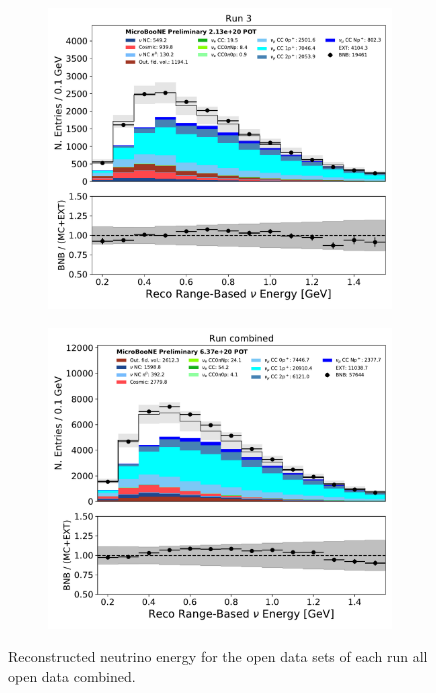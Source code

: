 \begin{figure}[hbt!]
\begin{center}
\begin{subfigure}[b]{0.35\textwidth}
    \end{subfigure}
    \begin{subfigure}[b]{0.35\textwidth}
        \centering
        \includegraphics[width=1.00\textwidth]{NuMuCCsel/Images/Ryan/Run3_nocrt/reco_nu_e_range_v_08052020_full_samples_longest_noCRT_event_category.pdf}
    \end{subfigure} %
    \begin{subfigure}[b]{0.35\textwidth}
        \centering
        \includegraphics[width=1.00\textwidth]{NuMuCCsel/Images/Ryan/combined/reco_nu_e_range_v_08052020_full_samples_longest_noCRT_event_category.pdf}
    \end{subfigure}
\caption{Reconstructed neutrino energy for the open data sets of each run all open data combined.}
\label{fig:NuMuCCsel:timedep:Enu}
\end{center}
\end{figure}

\clearpage

